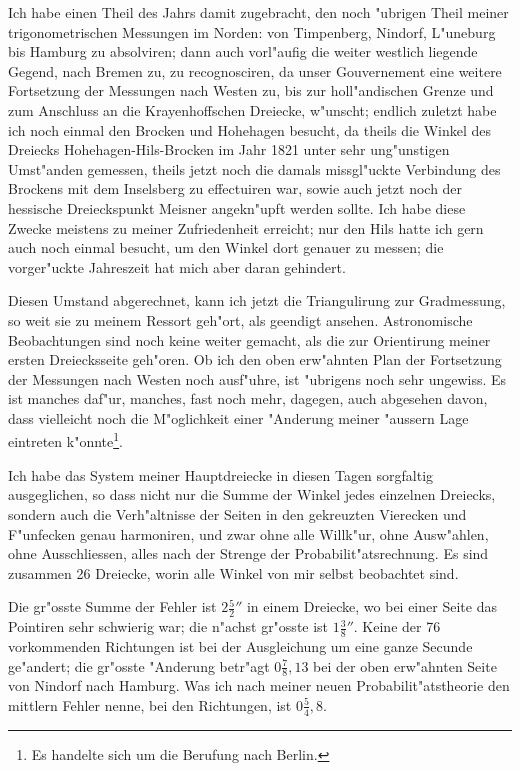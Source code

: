 \documentclass[12pt,a4paper]{article}
\theoremstyle{plain}
\theoremstyle{definition}
\theoremstyle{remark}
\begin{document}
\medskip
\noindent Ich habe einen Theil des Jahrs damit zugebracht, den noch "ubrigen Theil meiner trigonometrischen Messungen im Norden: von Timpenberg, Nindorf, L"uneburg bis Hamburg zu absolviren; dann auch vorl"aufig die weiter westlich liegende Gegend, nach Bremen zu, zu recognosciren, da unser Gouvernement eine weitere Fortsetzung der Messungen nach Westen zu, bis zur holl"andischen Grenze und zum Anschluss an die Krayenhoffschen Dreiecke, w"unscht; endlich zuletzt habe ich noch einmal den Brocken und Hohehagen besucht, da theils die Winkel des Dreiecks Hohehagen-Hils-Brocken im Jahr 1821 unter sehr ung"unstigen Umst"anden gemessen, theils jetzt noch die damals missgl"uckte Verbindung des Brockens mit dem Inselsberg zu effectuiren war, sowie auch jetzt noch der hessische Dreieckspunkt Meisner angekn"upft werden sollte. Ich habe diese Zwecke meistens zu meiner Zufriedenheit erreicht; nur den Hils hatte ich gern auch noch einmal besucht, um den Winkel dort genauer zu messen; die vorger"uckte Jahreszeit hat mich aber daran gehindert.

Diesen Umstand abgerechnet, kann ich jetzt die Triangulirung zur Gradmessung, so weit sie zu meinem Ressort geh"ort, als geendigt ansehen. Astronomische Beobachtungen sind noch keine weiter gemacht, als die zur Orientirung meiner ersten Dreiecksseite geh"oren. Ob ich den oben erw"ahnten Plan der Fortsetzung der Messungen nach Westen noch ausf"uhre, ist "ubrigens noch sehr ungewiss. Es ist manches daf"ur, manches, fast noch mehr, dagegen, auch abgesehen davon, dass vielleicht noch die M"oglichkeit einer "Anderung meiner "aussern Lage eintreten k"onnte\footnote{Es handelte sich um die Berufung nach Berlin.}.

\medskip
\noindent Ich habe das System meiner Hauptdreiecke in diesen Tagen sorgfaltig ausgeglichen, so dass nicht nur die Summe der Winkel jedes einzelnen Dreiecks, sondern auch die Verh"altnisse der Seiten in den gekreuzten Vierecken und F"unfecken genau harmoniren, und zwar ohne alle Willk"ur, ohne Ausw"ahlen, ohne Ausschliessen, alles nach der Strenge der Probabilit"atsrechnung. Es sind zusammen 26 Dreiecke, worin alle Winkel von mir selbst beobachtet sind.

\newpage
\noindent Die gr"osste Summe der Fehler ist $2\frac{5}{2}''$ in einem Dreiecke, wo bei einer Seite das Pointiren sehr schwierig war; die n"achst gr"osste ist $1\frac{3}{8}''$. Keine der 76 vorkommenden Richtungen ist bei der Ausgleichung um eine ganze Secunde ge"andert; die gr"osste "Anderung betr"agt $0\frac{7}{8}\!\!\!,\!13$ bei der oben erw"ahnten Seite von Nindorf nach Hamburg. Was ich nach meiner neuen Probabilit"atstheorie den mittlern Fehler nenne, bei den Richtungen, ist $0\frac{5}{4}\!\!\!,\!8$.
\end{document}
